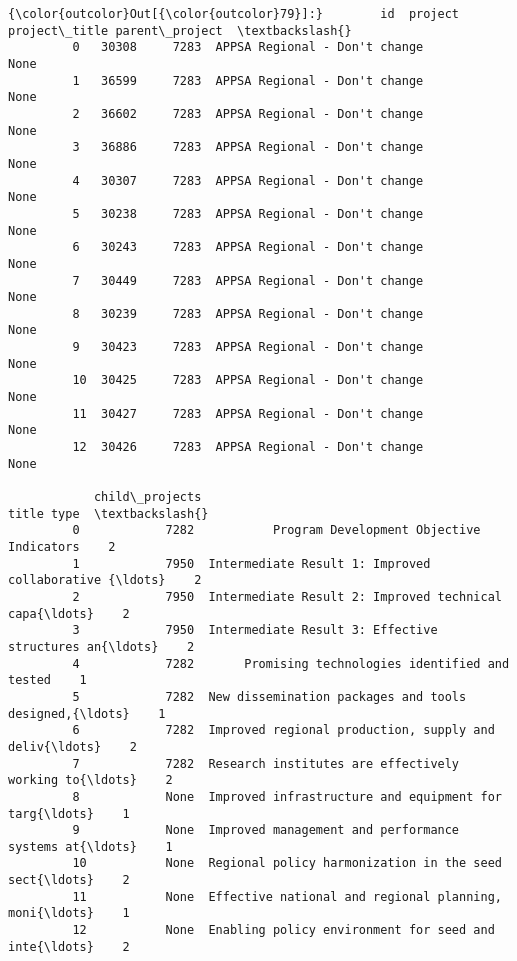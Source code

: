 \documentclass[11pt]{article}
\begin{document}
\begin{Verbatim}[commandchars=\\\{\}]
{\color{outcolor}Out[{\color{outcolor}79}]:}        id  project                  project\_title parent\_project  \textbackslash{}
         0   30308     7283  APPSA Regional - Don't change           None   
         1   36599     7283  APPSA Regional - Don't change           None   
         2   36602     7283  APPSA Regional - Don't change           None   
         3   36886     7283  APPSA Regional - Don't change           None   
         4   30307     7283  APPSA Regional - Don't change           None   
         5   30238     7283  APPSA Regional - Don't change           None   
         6   30243     7283  APPSA Regional - Don't change           None   
         7   30449     7283  APPSA Regional - Don't change           None   
         8   30239     7283  APPSA Regional - Don't change           None   
         9   30423     7283  APPSA Regional - Don't change           None   
         10  30425     7283  APPSA Regional - Don't change           None   
         11  30427     7283  APPSA Regional - Don't change           None   
         12  30426     7283  APPSA Regional - Don't change           None   
         
            child\_projects                                              title type  \textbackslash{}
         0            7282           Program Development Objective Indicators    2   
         1            7950  Intermediate Result 1: Improved collaborative {\ldots}    2   
         2            7950  Intermediate Result 2: Improved technical capa{\ldots}    2   
         3            7950  Intermediate Result 3: Effective structures an{\ldots}    2   
         4            7282       Promising technologies identified and tested    1   
         5            7282  New dissemination packages and tools designed,{\ldots}    1   
         6            7282  Improved regional production, supply and deliv{\ldots}    2   
         7            7282  Research institutes are effectively working to{\ldots}    2   
         8            None  Improved infrastructure and equipment for targ{\ldots}    1   
         9            None  Improved management and performance systems at{\ldots}    1   
         10           None  Regional policy harmonization in the seed sect{\ldots}    2   
         11           None  Effective national and regional planning, moni{\ldots}    1   
         12           None  Enabling policy environment for seed and  inte{\ldots}    2   
         

\end{Verbatim}
\end{document}
